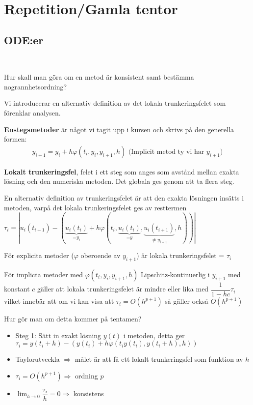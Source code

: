 \section{Repetition/Gamla tentor}
\par\bigskip
\subsection{ODE:er}\hfill\\
\par\bigskip
\noindent Hur skall man göra om en metod är konsistent samt bestämma nogrannhetsordning?\par
\noindent Vi introducerar en alternativ definition av det lokala trunkeringsfelet som förenklar analysen.
\par\bigskip
\noindent \textbf{Enstegsmetoder} är något vi tagit upp i kursen och skrivs på den generella formen:
\begin{equation*}
  \begin{gathered}
    y_{i+1} = y_i + h\varphi(t_i,y_i, y_{i+1}, h)\text{ (Implicit metod ty vi har $y_{i+1}$)}
  \end{gathered}
\end{equation*}
\par\bigskip
\noindent \textbf{Lokalt trunkeringsfel}, felet i ett steg som anges som avstånd mellan exakta lösning och den numeriska metoden. Det globala ges genom att ta flera steg.
\par\bigskip
\noindent En alternativ definition av trunkeringsfelet är att den exakta lösningen insätts i metoden, varpå det lokala trunkeringsfelet ges av resttermen $\tau_i = \left|u_i(t_{i+1})-(\underbrace{u_{i}(t_i)}_{\text{=$y_i$}}+h\varphi(t_i,\underbrace{u_i(t_i)}_{\text{=$y$}}, \underbrace{u_i(t_{i+1})}_{\text{$\neq y_{i+1}$}}, h))\right|$\par
\noindent För explicita metoder ($\varphi$ oberoende av $y_{i+1}$) är lokala trunkeringsfelet = $\tau_i$\par
\noindent För implicta metoder med $\varphi(t_i,y_i,y_{i+1},h)$ Lipschitz-kontinuerlig i $y_{i+1}$ med konstant $c$ gäller att lokala trunkeringsfelet är mindre eller lika med $\dfrac{1}{1-hc}\tau_i$ vilket innebär att om vi kan visa att $\tau_i = O(h^{p+1})$ så gäller också $O(h^{p+1})$
\par\bigskip
\noindent Hur gör man om detta kommer på tentamen?
\begin{itemize}
  \item Steg 1: Sätt in exakt lösning $y(t)$ i metoden, detta ger $\tau_i = y(t_i+h)-(y(t_i)+h\varphi(t_iy(t_i),y(t_i+h),h))$
  \item Taylorutveckla $\Rightarrow$ målet är att få ett lokalt trunkeringsfel som funktion av $h$
  \item $\tau_i = O(h^{p+1})\Rightarrow$ ordning $p$
  \item $\lim_{h\to 0}\dfrac{\tau_i}{h}=0\Rightarrow$ konsistens
\end{itemize}
